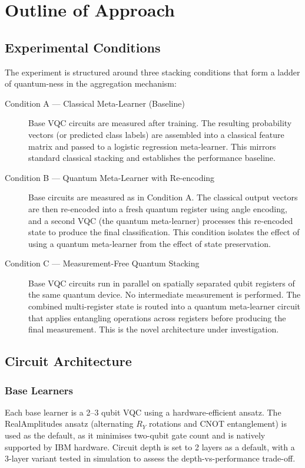 \documentclass[]{UCD_CS_FYP_Report}
\begin{document}
\chapter{Outline of Approach}

\section{Experimental Conditions}

The experiment is structured around three stacking conditions that form a ladder of quantum-ness in the aggregation mechanism:

\begin{description}
    \item[Condition A --- Classical Meta-Learner (Baseline)] Base VQC circuits are measured after training. The resulting probability vectors (or predicted class labels) are assembled into a classical feature matrix and passed to a logistic regression meta-learner. This mirrors standard classical stacking and establishes the performance baseline.
    
    \item[Condition B --- Quantum Meta-Learner with Re-encoding] Base circuits are measured as in Condition A. The classical output vectors are then re-encoded into a fresh quantum register using angle encoding, and a second VQC (the quantum meta-learner) processes this re-encoded state to produce the final classification. This condition isolates the effect of using a quantum meta-learner from the effect of state preservation.
    
    \item[Condition C --- Measurement-Free Quantum Stacking] Base VQC circuits run in parallel on spatially separated qubit registers of the same quantum device. No intermediate measurement is performed. The combined multi-register state is routed into a quantum meta-learner circuit that applies entangling operations across registers before producing the final measurement. This is the novel architecture under investigation.
\end{description}

\section{Circuit Architecture}

\subsection{Base Learners}
Each base learner is a 2--3 qubit VQC using a hardware-efficient ansatz. The RealAmplitudes ansatz (alternating $R_Y$ rotations and CNOT entanglement) is used as the default, as it minimises two-qubit gate count and is natively supported by IBM hardware. Circuit depth is set to 2 layers as a default, with a 3-layer variant tested in simulation to assess the depth-vs-performance trade-off.
\end{document}
